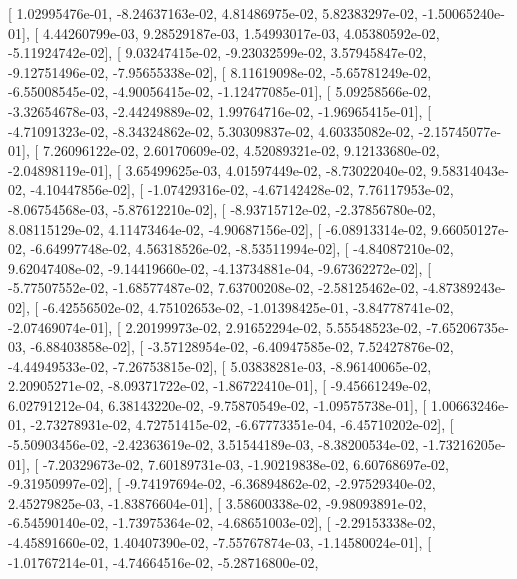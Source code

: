 \documentclass{article}
\begin{document}
       [  1.02995476e-01,  -8.24637163e-02,   4.81486975e-02,
          5.82383297e-02,  -1.50065240e-01],
       [  4.44260799e-03,   9.28529187e-03,   1.54993017e-03,
          4.05380592e-02,  -5.11924742e-02],
       [  9.03247415e-02,  -9.23032599e-02,   3.57945847e-02,
         -9.12751496e-02,  -7.95655338e-02],
       [  8.11619098e-02,  -5.65781249e-02,  -6.55008545e-02,
         -4.90056415e-02,  -1.12477085e-01],
       [  5.09258566e-02,  -3.32654678e-03,  -2.44249889e-02,
          1.99764716e-02,  -1.96965415e-01],
       [ -4.71091323e-02,  -8.34324862e-02,   5.30309837e-02,
          4.60335082e-02,  -2.15745077e-01],
       [  7.26096122e-02,   2.60170609e-02,   4.52089321e-02,
          9.12133680e-02,  -2.04898119e-01],
       [  3.65499625e-03,   4.01597449e-02,  -8.73022040e-02,
          9.58314043e-02,  -4.10447856e-02],
       [ -1.07429316e-02,  -4.67142428e-02,   7.76117953e-02,
         -8.06754568e-03,  -5.87612210e-02],
       [ -8.93715712e-02,  -2.37856780e-02,   8.08115129e-02,
          4.11473464e-02,  -4.90687156e-02],
       [ -6.08913314e-02,   9.66050127e-02,  -6.64997748e-02,
          4.56318526e-02,  -8.53511994e-02],
       [ -4.84087210e-02,   9.62047408e-02,  -9.14419660e-02,
         -4.13734881e-04,  -9.67362272e-02],
       [ -5.77507552e-02,  -1.68577487e-02,   7.63700208e-02,
         -2.58125462e-02,  -4.87389243e-02],
       [ -6.42556502e-02,   4.75102653e-02,  -1.01398425e-01,
         -3.84778741e-02,  -2.07469074e-01],
       [  2.20199973e-02,   2.91652294e-02,   5.55548523e-02,
         -7.65206735e-03,  -6.88403858e-02],
       [ -3.57128954e-02,  -6.40947585e-02,   7.52427876e-02,
         -4.44949533e-02,  -7.26753815e-02],
       [  5.03838281e-03,  -8.96140065e-02,   2.20905271e-02,
         -8.09371722e-02,  -1.86722410e-01],
       [ -9.45661249e-02,   6.02791212e-04,   6.38143220e-02,
         -9.75870549e-02,  -1.09575738e-01],
       [  1.00663246e-01,  -2.73278931e-02,   4.72751415e-02,
         -6.67773351e-04,  -6.45710202e-02],
       [ -5.50903456e-02,  -2.42363619e-02,   3.51544189e-03,
         -8.38200534e-02,  -1.73216205e-01],
       [ -7.20329673e-02,   7.60189731e-03,  -1.90219838e-02,
          6.60768697e-02,  -9.31950997e-02],
       [ -9.74197694e-02,  -6.36894862e-02,  -2.97529340e-02,
          2.45279825e-03,  -1.83876604e-01],
       [  3.58600338e-02,  -9.98093891e-02,  -6.54590140e-02,
         -1.73975364e-02,  -4.68651003e-02],
       [ -2.29153338e-02,  -4.45891660e-02,   1.40407390e-02,
         -7.55767874e-03,  -1.14580024e-01],
       [ -1.01767214e-01,  -4.74664516e-02,  -5.28716800e-02,
\end{document}
